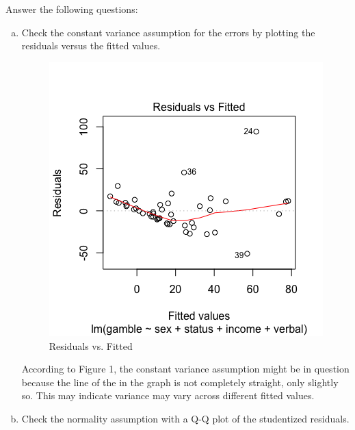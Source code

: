 \documentclass[12pt,letterpaper]{article}
\begin{document}
\vspace{.5cm}
  
\vspace{.5cm}
Answer the following questions:
\vspace{.5cm}
\begin{enumerate}[(a)]
	 \item Check the constant variance assumption for the errors by plotting the residuals versus the fitted values.
	 
	   
	 
	 	\begin{figure}[h!]
	 	\caption{\footnotesize{Residuals vs. Fitted}}
	 	\vspace{.5cm}
	 	\centering
	 	\label{fig:residvfitted}
	 	\includegraphics[width=1\textwidth]{./PS5_Graph_1.png}
	 \end{figure}	
 	
 	According to Figure 1, the constant variance assumption might be in question because the line of the in the graph is not completely straight, only slightly so. This may indicate variance may vary across different fitted values.
 
	 \vspace{1cm}
	 
	\item Check the normality assumption with a Q-Q plot of the studentized residuals. 
	

\end{enumerate}
\end{document}
